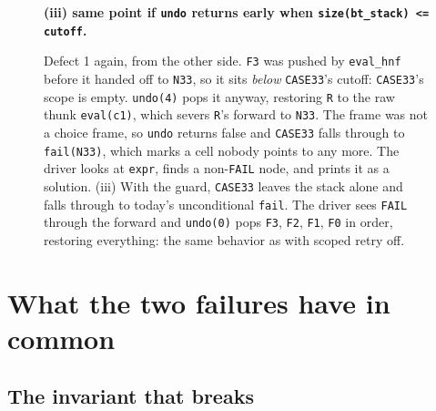 \documentclass[11pt]{article}
\makeatletter
\newcommand{\code}[1]{\texttt{#1}}
\newcommand{\cn}[2]{{\scriptsize\itshape #1}\\[-1pt]{\ttfamily #2}}
\newcommand{\fr}[4]{\textbf{#1} & #2 & $\mapsto$ & \texttt{#3} & #4\\}
\newcommand{\cutrow}[1]{\hline\multicolumn{5}{@{}l@{}}{\textcolor{cutcol}{\textbf{#1}}}\\\hline}
\newcommand{\trailnode}[2]{\node[trail] at (#1) {%
  \begin{tabular}{@{}l@{\;}l@{\;}c@{\;}l@{\;}l@{}}
  \multicolumn{5}{@{}l@{}}{\itshape trail (top of stack first)}\\ #2 \hline
  \end{tabular}};}
\makeatother
\begin{document}
\begin{figure}[p]
\bigskip
\textbf{(iii) same point if \code{undo} returns early when \code{size(bt\_stack) <= cutoff}.}\par\smallskip
{}
\caption{Defect 1 again, from the other side. \code{F3} was pushed by
  \code{eval\_hnf} before it handed off to \code{N33}, so it sits \emph{below}
  \code{CASE33}'s cutoff: \code{CASE33}'s scope is empty. \code{undo(4)} pops
  it anyway, restoring \code{R} to the raw thunk \code{eval(c1)}, which
  severs \code{R}'s forward to \code{N33}. The frame was not a choice frame,
  so \code{undo} returns false and \code{CASE33} falls through to
  \code{fail(N33)}, which marks a cell nobody points to any more. The driver
  looks at \code{expr}, finds a non-\code{FAIL} node, and prints it as a
  solution. (iii) With the guard, \code{CASE33} leaves the stack alone and
  falls through to today's unconditional \code{fail}. The driver sees
  \code{FAIL} through the forward and \code{undo(0)} pops \code{F3},
  \code{F2}, \code{F1}, \code{F0} in order, restoring everything: the same
  behavior as with scoped retry off.}
\label{fig:a2}
\end{figure}



\clearpage
\section{What the two failures have in common}\label{sec:summary}

\subsection{The invariant that breaks}
\end{document}
